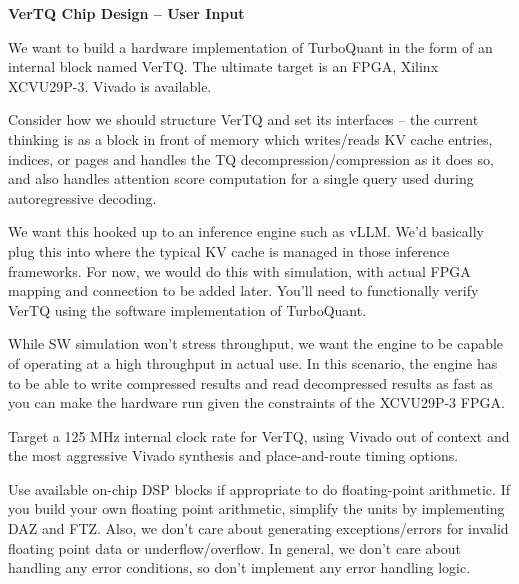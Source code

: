 \begin{tcolorbox}[
	colback=white,
	colframe=black,
	coltext=vrkblue,
	breakable,
	fontupper=\scriptsize\fontfamily{pcr}\selectfont,
	before upper={\RaggedRight}
	]
	\textbf{VerTQ Chip Design -- User Input}
	
	\smallskip
	
	We want to build a hardware implementation of TurboQuant in the form of an internal block named VerTQ. The ultimate target is an FPGA, Xilinx XCVU29P-3. Vivado is available.
	
	\smallskip
	
	Consider how we should structure VerTQ and set its interfaces -- the current thinking is as a block in front of memory which writes/reads KV cache entries, indices, or pages and handles the TQ decompression/compression as it does so, and also handles attention score computation for a single query used during autoregressive decoding.
	
	\smallskip
	
	We want this hooked up to an inference engine such as vLLM. We'd basically plug this into where the typical KV cache is managed in those inference frameworks. For now, we would do this with simulation, with actual FPGA mapping and connection to be added later. You'll need to functionally verify VerTQ using the software implementation of TurboQuant.
	
	\smallskip
	
	While SW simulation won't stress throughput, we want the engine to be capable of operating at a high throughput in actual use. In this scenario, the engine has to be able to write compressed results and read decompressed results as fast as you can make the hardware run given the constraints of the XCVU29P-3 FPGA.
	
	\smallskip
	
	Target a 125 MHz internal clock rate for VerTQ, using Vivado out of context and the most aggressive Vivado synthesis and place-and-route timing options.
	
	\smallskip
	
	Use available on-chip DSP blocks if appropriate to do floating-point arithmetic. If you build your own floating point arithmetic, simplify the units by implementing DAZ and FTZ. Also, we don't care about generating exceptions/errors for invalid floating point data or underflow/overflow. In general, we don't care about handling any error conditions, so don't implement any error handling logic.
	
	\smallskip
	

\end{tcolorbox}
